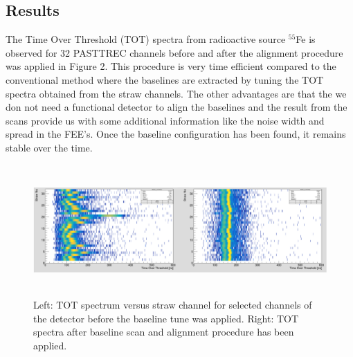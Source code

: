 \documentclass{article}
\begin{document}
\subsection*{Results}
The Time Over Threshold (TOT) spectra from radioactive source $^{55}$Fe is observed for 32 PASTTREC channels before and after the alignment procedure was applied in Figure 2. This procedure is very time efficient compared to the conventional method where the baselines are extracted by tuning the TOT spectra obtained from the straw channels. The other advantages are that the we don not need a functional detector to align the baselines and the result from the scans provide us with some additional information like the noise width and spread in the FEE's. Once the baseline configuration has been found, it remains stable over the time.
\begin{figure}[!ht]
\centering
\includegraphics[width=12cm,height=5cm]{TOT_allignment.png}
\caption{Left: TOT spectrum versus straw channel for selected channels of the detector
before the baseline tune was applied. Right: TOT spectra after baseline scan and alignment procedure has been applied.}
\end{figure}
\end{document}
